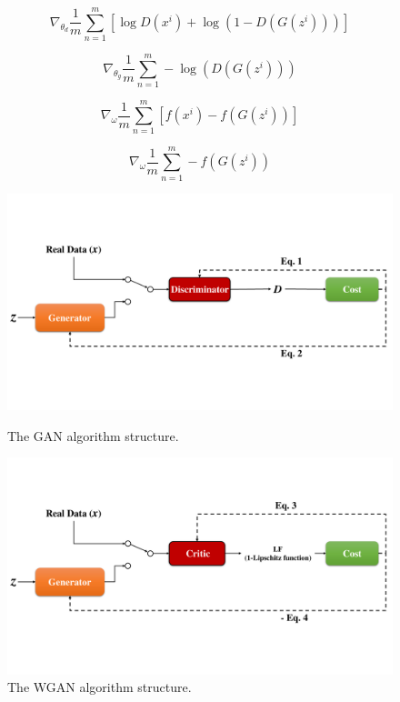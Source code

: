 \documentclass[conference]{IEEEtran}
\begin{document}
\begin{equation}
\nabla_{\theta_{d}}\frac{1}{m}\sum_{n=1}^{m}[\log D(x^{i})+\log(1-D(G(z^{i})))]
\label{dgan}
\end{equation}

\begin{equation}
\nabla_{\theta_{g}}\frac{1}{m}\sum_{n=1}^{m} -\log(D(G(z^{i})))
\label{ggan}
\end{equation}



\begin{equation}
\nabla_{\omega}\frac{1}{m}\sum_{n=1}^{m}[f(x^{i})-f(G(z^{i}))]
\label{cwgan}
\end{equation}




\begin{equation}
\nabla_{\omega}\frac{1}{m}\sum_{n=1}^{m} -f(G(z^{i}))
\label{gwgan}
\end{equation}

\begin{figure}
\centering
\includegraphics[width=1\columnwidth]{gan}
\caption{The GAN algorithm structure.}
\label{gann}
\centering
\includegraphics[width=1\columnwidth]{wgan}
\caption{The WGAN algorithm structure.}
\label{wgann}
\end{figure}
\end{document}
